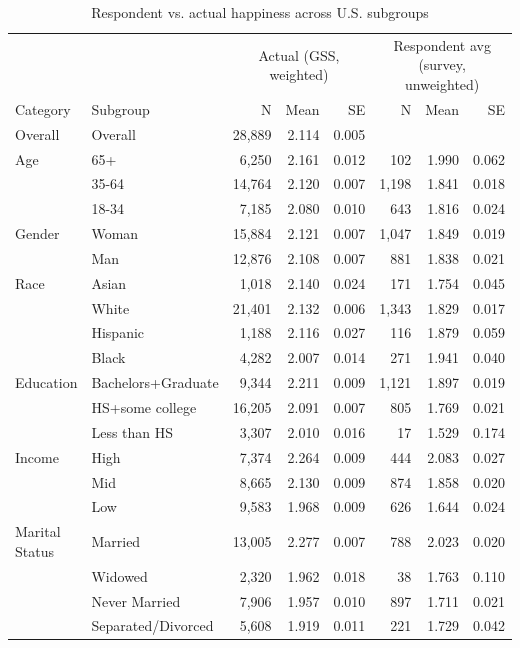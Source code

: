 \begin{table}[htbp]
\centering
\caption{Respondent vs. actual happiness across U.S. subgroups}
\begin{tabular}{llrrrrrr}
\toprule
 & & \multicolumn{3}{c}{Actual (GSS, weighted)} & \multicolumn{3}{c}{Respondent avg (survey, unweighted)} \\
Category & Subgroup & N & Mean & SE & N & Mean & SE \\
\midrule
Overall & Overall & 28,889 & 2.114 & 0.005 & & & \\
\midrule
Age & 65+ & 6,250 & 2.161 & 0.012 & 102 & 1.990 & 0.062 \\
 & 35-64 & 14,764 & 2.120 & 0.007 & 1,198 & 1.841 & 0.018 \\
 & 18-34 & 7,185 & 2.080 & 0.010 & 643 & 1.816 & 0.024 \\
\midrule
Gender & Woman & 15,884 & 2.121 & 0.007 & 1,047 & 1.849 & 0.019 \\
 & Man & 12,876 & 2.108 & 0.007 & 881 & 1.838 & 0.021 \\
\midrule
Race & Asian & 1,018 & 2.140 & 0.024 & 171 & 1.754 & 0.045 \\
 & White & 21,401 & 2.132 & 0.006 & 1,343 & 1.829 & 0.017 \\
 & Hispanic & 1,188 & 2.116 & 0.027 & 116 & 1.879 & 0.059 \\
 & Black & 4,282 & 2.007 & 0.014 & 271 & 1.941 & 0.040 \\
\midrule
Education & Bachelors+Graduate & 9,344 & 2.211 & 0.009 & 1,121 & 1.897 & 0.019 \\
 & HS+some college & 16,205 & 2.091 & 0.007 & 805 & 1.769 & 0.021 \\
 & Less than HS & 3,307 & 2.010 & 0.016 & 17 & 1.529 & 0.174 \\
\midrule
Income & High & 7,374 & 2.264 & 0.009 & 444 & 2.083 & 0.027 \\
 & Mid & 8,665 & 2.130 & 0.009 & 874 & 1.858 & 0.020 \\
 & Low & 9,583 & 1.968 & 0.009 & 626 & 1.644 & 0.024 \\
\midrule
Marital Status & Married & 13,005 & 2.277 & 0.007 & 788 & 2.023 & 0.020 \\
 & Widowed & 2,320 & 1.962 & 0.018 & 38 & 1.763 & 0.110 \\
 & Never Married & 7,906 & 1.957 & 0.010 & 897 & 1.711 & 0.021 \\
 & Separated/Divorced & 5,608 & 1.919 & 0.011 & 221 & 1.729 & 0.042 \\

\end{tabular}
\end{table}
